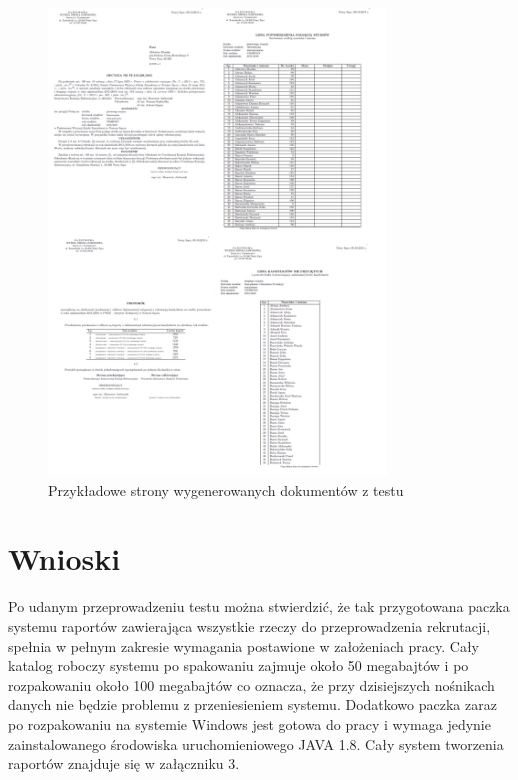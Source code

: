 \begin{figure}[h]
    \centering
    \includegraphics[width=0.8\textwidth]{rys/testy/wynik.png}
    \caption{Przykładowe strony wygenerowanych dokumentów z  testu }
    \label{fig:test}
\end{figure}
\section{Wnioski}
Po udanym przeprowadzeniu testu można stwierdzić, że tak przygotowana paczka systemu raportów zawierająca wszystkie rzeczy do przeprowadzenia rekrutacji, spełnia w pełnym zakresie wymagania postawione w założeniach pracy. Cały katalog roboczy systemu po spakowaniu zajmuje około 50 megabajtów i po rozpakowaniu około 100 megabajtów co oznacza, że przy dzisiejszych nośnikach danych nie będzie problemu z przeniesieniem systemu. Dodatkowo paczka zaraz po rozpakowaniu na systemie Windows jest gotowa do pracy i wymaga jedynie zainstalowanego środowiska uruchomieniowego JAVA 1.8. Cały system tworzenia raportów znajduje się w załączniku 3.

